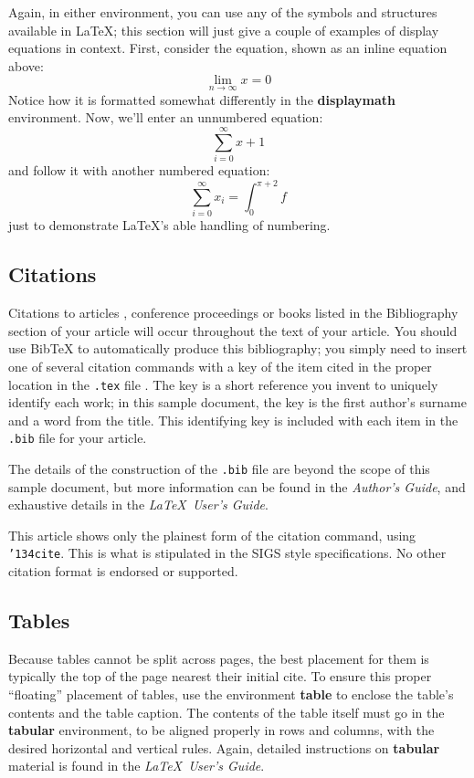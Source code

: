 \documentclass{aamas2012}
\begin{document}
Again, in either environment, you can use any of the symbols
and structures available in \LaTeX; this section will just
give a couple of examples of display equations in context.
First, consider the equation, shown as an inline equation above:
\begin{equation}\lim_{n\rightarrow \infty}x=0\end{equation}
Notice how it is formatted somewhat differently in
the \textbf{displaymath}
environment.  Now, we'll enter an unnumbered equation:
\begin{displaymath}\sum_{i=0}^{\infty} x + 1\end{displaymath}
and follow it with another numbered equation:
\begin{equation}\sum_{i=0}^{\infty}x_i=\int_{0}^{\pi+2} f\end{equation}
just to demonstrate \LaTeX's able handling of numbering.

\subsection{Citations}
Citations to articles \cite{bowman:reasoning,
clark:pct, braams:babel, herlihy:methodology},
conference proceedings \cite{clark:pct} or
books \cite{salas:calculus, Lamport:LaTeX} listed
in the Bibliography section of your
article will occur throughout the text of your article.
You should use BibTeX to automatically produce this bibliography;
you simply need to insert one of several citation commands with
a key of the item cited in the proper location in
the \texttt{.tex} file \cite{Lamport:LaTeX}.
The key is a short reference you invent to uniquely
identify each work; in this sample document, the key is
the first author's surname and a
word from the title.  This identifying key is included
with each item in the \texttt{.bib} file for your article.

The details of the construction of the \texttt{.bib} file
are beyond the scope of this sample document, but more
information can be found in the \textit{Author's Guide},
and exhaustive details in the \textit{\LaTeX\ User's
Guide}\cite{Lamport:LaTeX}.

This article shows only the plainest form
of the citation command, using \texttt{{\char'134}cite}.
This is what is stipulated in the SIGS style specifications.
No other citation format is endorsed or supported.

\subsection{Tables}
Because tables cannot be split across pages, the best
placement for them is typically the top of the page
nearest their initial cite.  To
ensure this proper ``floating'' placement of tables, use the
environment \textbf{table} to enclose the table's contents and
the table caption.  The contents of the table itself must go
in the \textbf{tabular} environment, to
be aligned properly in rows and columns, with the desired
horizontal and vertical rules.  Again, detailed instructions
on \textbf{tabular} material
is found in the \textit{\LaTeX\ User's Guide}.
\end{document}
